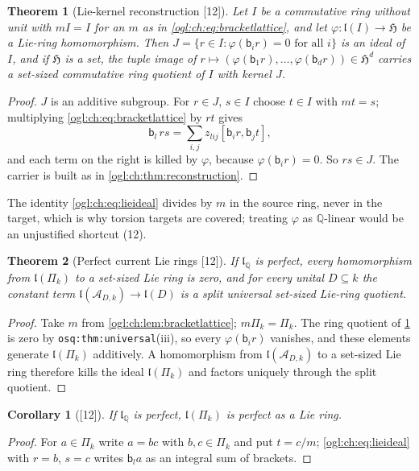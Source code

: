 \documentclass[11pt,oneside]{article}
\numberwithin{equation}{section}
\newtheorem{theorem}{Theorem}[section]
\newtheorem{corollary}[corollary]{Corollary}
\theoremstyle{definition}
\theoremstyle{remark}
\newcommand{\Q}{\mathbb Q}
\newcommand{\A}{\mathcal A}
\newcommand{\src}[1]{\textup{\textsf{\small[#1]}}}
\newcommand{\replabel}[1]{\nolinkurl{#1}}
\begin{document}
\begin{theorem}[Lie-kernel reconstruction \src{12}]\label{ogl:ch:thm:liereconstruction}
Let $I$ be a commutative ring without unit with $mI=I$ for an $m$ as in
\eqref{ogl:ch:eq:bracketlattice}, and let $\varphi:\mathfrak l(I)\to\mathfrak H$ be a
Lie-ring homomorphism. Then $J=\{r\in I:\varphi(\mathsf b_ir)=0\text{ for all }i\}$
is an ideal of $I$, and if $\mathfrak H$ is a set, the tuple image of
$r\mapsto(\varphi(\mathsf b_1r),\dots,\varphi(\mathsf b_dr))\in\mathfrak H^d$ carries a
set-sized commutative ring quotient of $I$ with kernel $J$.
\end{theorem}
\begin{proof}
$J$ is an additive subgroup. For $r\in J$, $s\in I$ choose $t\in I$ with $mt=s$;
multiplying \eqref{ogl:ch:eq:bracketlattice} by $rt$ gives
\begin{equation}\label{ogl:ch:eq:lieideal}
 \mathsf b_l\,rs=\sum_{i,j}z_{lij}[\mathsf b_ir,\mathsf b_jt],
\end{equation}
and each term on the right is killed by $\varphi$, because $\varphi(\mathsf b_ir)=0$.
So $rs\in J$. The carrier is built as in \cref{ogl:ch:thm:reconstruction}.
\end{proof}

The identity \eqref{ogl:ch:eq:lieideal} divides by $m$ in the source ring, never
in the target, which is why torsion targets are covered; treating $\varphi$ as
$\Q$-linear would be an unjustified shortcut (12).

\begin{theorem}[Perfect current Lie rings \src{12}]\label{ogl:ch:thm:liepositive}
If $\mathfrak l_\Q$ is perfect, every homomorphism from $\mathfrak l(\Pi_k)$ to a
set-sized Lie ring is zero, and for every unital $D\subseteq k$ the constant term
$\mathfrak l(\A_{D,k})\to\mathfrak l(D)$ is a split universal set-sized Lie-ring
quotient.
\end{theorem}
\begin{proof}
Take $m$ from \cref{ogl:ch:lem:bracketlattice}; $m\Pi_k=\Pi_k$. The ring
quotient of \cref{ogl:ch:thm:liereconstruction} is zero by
\replabel{osq:thm:universal}(iii), so every $\varphi(\mathsf b_ir)$ vanishes, and
these elements generate $\mathfrak l(\Pi_k)$ additively. A homomorphism from
$\mathfrak l(\A_{D,k})$ to a set-sized Lie ring therefore kills the ideal
$\mathfrak l(\Pi_k)$ and factors uniquely through the split quotient.
\end{proof}

\begin{corollary}[\src{12}]\label{ogl:ch:cor:lieperfect}
If $\mathfrak l_\Q$ is perfect, $\mathfrak l(\Pi_k)$ is perfect as a Lie ring.
\end{corollary}
\begin{proof}
For $a\in\Pi_k$ write $a=bc$ with $b,c\in\Pi_k$ and put $t=c/m$;
\eqref{ogl:ch:eq:lieideal} with $r=b$, $s=c$ writes $\mathsf b_la$ as an integral
sum of brackets.
\end{proof}
\end{document}

